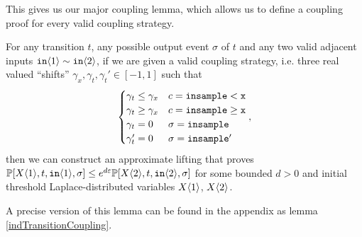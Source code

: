 This gives us our major coupling lemma, which allows us to define a coupling proof for every valid coupling strategy.

\begin{lemma}\label{simplifiedIndTransitionCoupling}
  For any transition $t$, any possible output event $\sigma$ of $t$ and any two valid adjacent inputs $\texttt{in}\brangle{1}\sim \texttt{in}\brangle{2}$, if we are given a valid coupling strategy, i.e. three real valued ``shifts'' $\gamma_x, \gamma_t, \gamma_t'\in [-1, 1]$ such that \[
    \begin{cases}
      \gamma_t\leq\gamma_x & c = \lguard[\texttt{x}]\\
      \gamma_t\geq\gamma_x & c = \gguard[\texttt{x}]\\
      \gamma_t=0 & \sigma = \texttt{insample}\\
      \gamma_t'=0 & \sigma = \texttt{insample}'
    \end{cases},
  \]
  then we can construct an approximate lifting that proves $\PP[X\brangle{1}, t, \texttt{in}\brangle{1}, \sigma]\leq e^{d\varepsilon}\PP[X\brangle{2}, t, \texttt{in}\brangle{2}, \sigma]$ for some bounded $d>0$ and initial threshold Laplace-distributed variables $X\brangle{1}$, $X\brangle{2}$.
\end{lemma}

A precise version of this lemma can be found in the appendix as lemma \ref{indTransitionCoupling}. 



